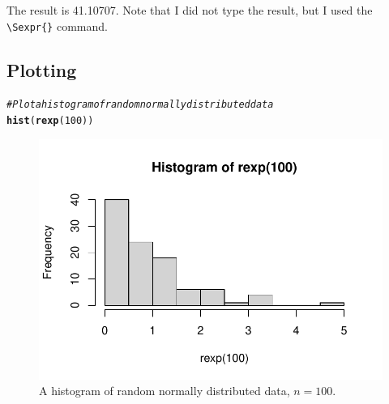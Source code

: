 \documentclass{article}\usepackage[]{graphicx}\usepackage[]{xcolor}
\makeatletter
\def\maxwidth{ %
  \ifdim\Gin@nat@width>\linewidth
    \linewidth
  \else
    \Gin@nat@width
  \fi
}
\newcommand{\hlnum}[1]{\textcolor[rgb]{0.686,0.059,0.569}{#1}}%
\newcommand{\hlcom}[1]{\textcolor[rgb]{0.678,0.584,0.686}{\textit{#1}}}%
\newcommand{\hldef}[1]{\textcolor[rgb]{0.345,0.345,0.345}{#1}}%
\newcommand{\hlkwd}[1]{\textcolor[rgb]{0.737,0.353,0.396}{\textbf{#1}}}%
\newenvironment{kframe}{%
 \def\at@end@of@kframe{}%
 \ifinner\ifhmode%
  \def\at@end@of@kframe{\end{minipage}}%
  \begin{minipage}{\columnwidth}%
 \fi\fi%
 \def\FrameCommand##1{\hskip\@totalleftmargin \hskip-\fboxsep
 \colorbox{shadecolor}{##1}\hskip-\fboxsep
     \hskip-\linewidth \hskip-\@totalleftmargin \hskip\columnwidth}%
 \MakeFramed {\advance\hsize-\width
   \@totalleftmargin\z@ \linewidth\hsize
   \@setminipage}}%
 {\par\unskip\endMakeFramed%
 \at@end@of@kframe}
\newenvironment{knitrout}{}{} %
\makeatother
\begin{document}
\begin{multicols}{2}
The result is 41.10707. Note that I did not type the result, but I used the \verb|\Sexpr{}| command.

\subsection{Plotting}
\begin{knitrout}\scriptsize
{}\color{fgcolor}\begin{kframe}
\begin{alltt}
\hlcom{#Plot a histogram of random normally distributed data}
\hlkwd{hist}\hldef{(}\hlkwd{rexp}\hldef{(}\hlnum{100}\hldef{))}
\end{alltt}
\end{kframe}
\end{knitrout}

\begin{figure}[H]
\begin{center}
\begin{knitrout}
\color{fgcolor}
\includegraphics[width=\maxwidth]{figure/unnamed-chunk-6-1} 
\end{knitrout}
\caption{A histogram of random normally distributed data, $n=100$.}
\label{plot1} %
\end{center}
\end{figure}


\end{multicols}
\end{document}
